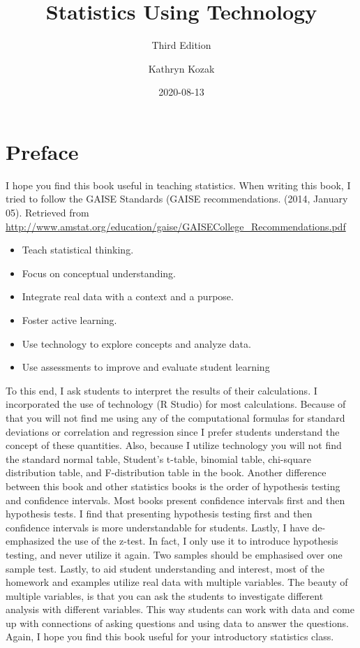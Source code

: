 \documentclass[
]{book}
\title{Statistics Using Technology}
\subtitle{Third Edition}
\author{Kathryn Kozak}
\date{2020-08-13}
\providecommand{\tightlist}{%
  \setlength{\itemsep}{0pt}\setlength{\parskip}{0pt}}
\begin{document}
\maketitle

{
\setcounter{tocdepth}{1}
\tableofcontents
}
\hypertarget{preface}{%
\chapter*{Preface}\label{preface}}

I hope you find this book useful in teaching statistics. When writing this book, I tried to follow the GAISE Standards (GAISE recommendations. (2014, January 05). Retrieved from \url{http://www.amstat.org/education/gaise/GAISECollege_Recommendations.pdf}

\begin{itemize}
\tightlist
\item
  Teach statistical thinking.
\item
  Focus on conceptual understanding.
\item
  Integrate real data with a context and a purpose.
\item
  Foster active learning.
\item
  Use technology to explore concepts and analyze data.
\item
  Use assessments to improve and evaluate student learning
\end{itemize}

To this end, I ask students to interpret the results of their calculations. I incorporated the use of technology (R Studio) for most calculations. Because of that you will not find me using any of the computational formulas for standard deviations or correlation and regression since I prefer students understand the concept of these quantities. Also, because I utilize technology you will not find the standard normal table, Student's t-table, binomial table, chi-square distribution table, and F-distribution table in the book. Another difference between this book and other statistics books is the order of hypothesis testing and confidence intervals. Most books present confidence intervals first and then hypothesis tests. I find that presenting hypothesis testing first and then confidence intervals is more understandable for students. Lastly, I have de-emphasized the use of the z-test. In fact, I only use it to introduce hypothesis testing, and never utilize it again. Two samples should be emphasised over one sample test. Lastly, to aid student understanding and interest, most of the homework and examples utilize real data with multiple variables. The beauty of multiple variables, is that you can ask the students to investigate different analysis with different variables. This way students can work with data and come up with connections of asking questions and using data to answer the questions. Again, I hope you find this book useful for your introductory statistics class.
\end{document}
